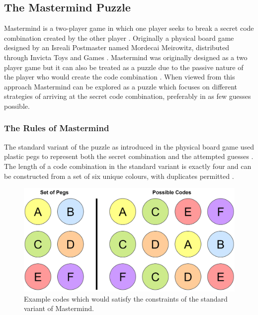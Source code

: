 \documentclass[11pt]{article}  %
\theoremstyle{definition}
\theoremstyle{remark}
\begin{document}
\subsection {The Mastermind Puzzle}

Mastermind is a two-player game in which one player seeks to break a secret code combination created by the other player \cite{Wolfram}. Originally a physical board game designed by an Isreali Postmaster named Mordecai Meirowitz, distributed through Invicta Toys and Games \cite{Invicta}. Mastermind was originally designed as a two player game but it can also be treated as a puzzle due to the passive nature of the player who would create the code combination \cite {Better Solutions}. When viewed from this approach Mastermind can be explored as a puzzle which focuses on different strategies of arriving at the secret code combination, preferably in as few guesses possible.

\subsubsection {The Rules of Mastermind}

The standard variant of the puzzle as introduced in the physical board game used plastic pegs to represent both the secret combination and the attempted guesses \cite {Invicta}.
The length of a code combination in the standard variant is exactly four and can be constructed from a set of six unique colours, with duplicates permitted \cite{Wolfram}.

\begin{figure}[H]
\centering
\includegraphics[scale=0.4]{pegs}
\caption{ Example codes which would satisfy the constraints of the standard variant of Mastermind.}
\end{figure}
\end{document}
